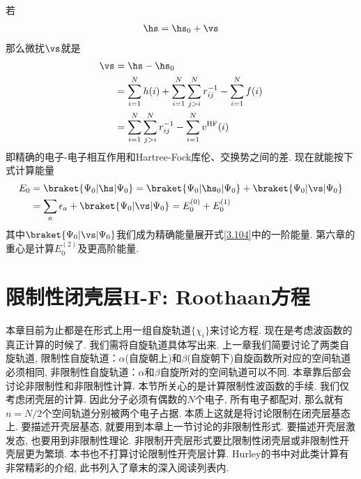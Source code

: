 若
\begin{align}
\hs = \hs_0 + \vs
\end{align}
那么微扰$\vs$就是
\begin{align}
\vs & = \hs -\hs_0\notag\\
    & = \sum_{i=1}^{N}h(i) + \sum_{i=1}^{N}\sum_{j>i}^{N}r_{ij}^{-1} - \sum_{i=1}^{N}f(i)\notag\\
    & = \sum_{i=1}^{N}\sum_{j>i}^{N}r_{ij}^{-1} - \sum_{i=1}^{N}v^\mathrm{HF}(i)
    \label{3.108}
\end{align}
即精确的电子-电子相互作用和Hartree-Fock库伦、交换势之间的差. 现在就能按下式计算\hft 能量
\begin{align}
E_0 & = \braket{\Psi_0|\hs|\Psi_0} = \braket{\Psi_0|\hs_0|\Psi_0} + \braket{\Psi_0|\vs|\Psi_0} \notag\\
    & = \sum_a\epsilon_a + \braket{\Psi_0|\vs|\Psi_0} = E_0^{(0)} + E_0^{(1)}
\end{align}
其中$\braket{\Psi_0|\vs|\Psi_0}$我们成为精确能量展开式\eqref{3.104}中的一阶能量. 第六章的重心是计算$E_0^{(2)}$及更高阶能量.
\section{限制性闭壳层H-F: Roothaan方程}
本章目前为止都是在形式上用一组自旋轨道$\{\chi_i\}$来讨论\hft 方程. 现在是考虑\hft 波函数的真正计算的时候了. 我们需将自旋轨道具体写出来. 上一章我们简要讨论了两类自旋轨道, 限制性自旋轨道：$\alpha$(自旋朝上)和$\beta$(自旋朝下)自旋函数所对应的空间轨道必须相同, 非限制性自旋轨道：$\alpha$和$\beta$自旋所对的空间轨道可以不同. 本章靠后部会讨论非限制性\hft 和非限制性\hft 计算. 本节所关心的是计算限制性\hft 波函数的手续. 我们仅考虑闭壳层的计算.
因此分子必须有偶数的$N$个电子, 所有电子都配对, 那么就有$n=N/2$个空间轨道分别被两个电子占据. 本质上这就是将讨论限制在闭壳层基态上. 要描述开壳层基态, 就要用到本章上一节讨论的非限制性形式. 要描述开壳层激发态, 也要用到非限制性\hft 理论. 非限制开壳层形式要比限制性闭壳层或非限制性开壳层更为繁琐. 本书也不打算讨论限制性开壳层\hft 计算. Hurley的书中对此类计算有非常精彩的介绍, 此书列入了章末的深入阅读列表内.
